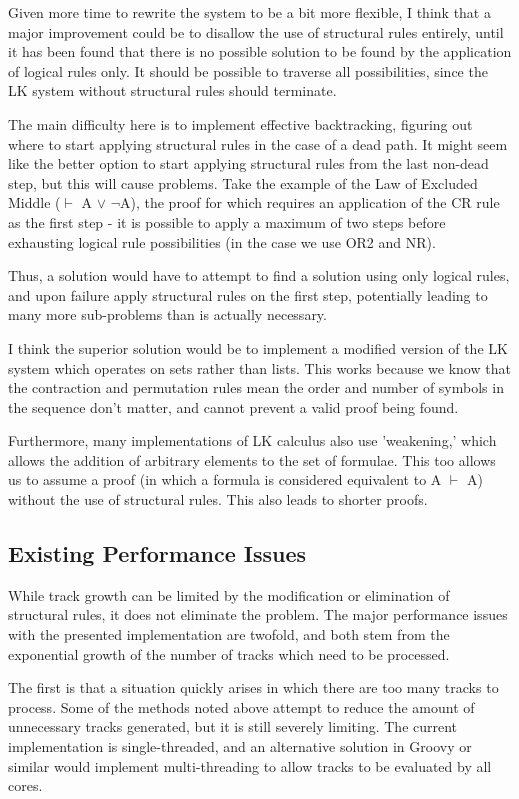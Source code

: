 \documentclass{article}
\begin{document}
Given more time to rewrite the system to be a bit more flexible, I think that a
major improvement could be to disallow the use of structural rules entirely,
until it has been found that there is no possible solution to be found by the
application of logical rules only. It should be possible to traverse all
possibilities, since the LK system without structural rules should terminate.

The main difficulty here is to implement
effective backtracking, figuring out where to start applying structural rules
in the case of a dead path. It might seem like the better option to start
applying structural rules from the last non-dead step, but this will cause
problems. Take the example of the Law of Excluded Middle
($\vdash$ A $\vee$ $\neg$A), the proof for which requires an application of the
CR rule as the first step - it is possible to apply a maximum of two steps
before exhausting logical rule possibilities (in the case we use OR2 and NR).

Thus, a solution would have to attempt to find a solution using only logical
rules, and upon failure apply structural rules on the first step, potentially
leading to many more sub-problems than is actually necessary.

I think the superior solution would be to implement a modified version of the LK
system which operates on sets rather than lists. This works because we know
that the contraction and permutation rules mean the order and number of symbols
in the sequence don't matter, and cannot prevent a valid proof being found.

Furthermore, many implementations of LK calculus also use 'weakening,' which
allows the addition of arbitrary elements to the set of formulae. This too
allows us to assume a proof (in which a formula is considered equivalent to A
$\vdash$ A) without the use of structural rules. This also leads to shorter
proofs.

\subsection{Existing Performance Issues}

While track growth can be limited by the modification or elimination of
structural rules, it does not eliminate the problem. The major performance 
issues with the presented implementation are twofold, and both stem from the 
exponential growth of the number of tracks which need to be processed.

The first is that a situation quickly arises in which there are too many tracks
to process. Some of the methods noted above attempt to reduce the amount of
unnecessary tracks generated, but it is still severely limiting. The current
implementation is single-threaded, and an alternative solution in Groovy or
similar would implement multi-threading to allow tracks to be evaluated by all
cores.
\end{document}

